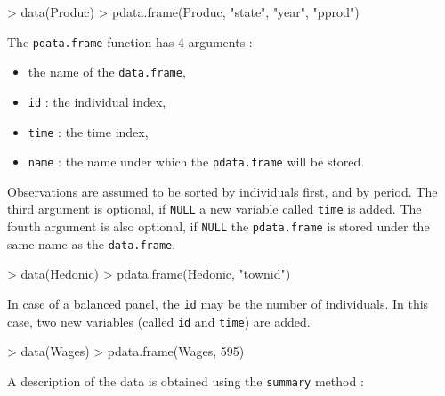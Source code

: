 \documentclass{article}
\begin{document}
\begin{Schunk}
\begin{Sinput}
> data(Produc)
> pdata.frame(Produc, "state", "year", "pprod")
\end{Sinput}
\end{Schunk}

The  \texttt{pdata.frame} function has  4 arguments :

\begin{itemize}
\item the name of the  \texttt{data.frame},
\item \texttt{id} : the individual index,
\item \texttt{time} : the time index,
\item \texttt{name} : the name under which the \texttt{pdata.frame}
  will be stored.
\end{itemize}

Observations are assumed to be sorted by individuals first, and by
period. The third argument is optional, if \texttt{NULL} a new
variable called \texttt{time} is added. The fourth argument is also
optional, if \texttt{NULL} the \texttt{pdata.frame} is stored under
the same name as the \texttt{data.frame}.


\begin{Schunk}
\begin{Sinput}
> data(Hedonic)
> pdata.frame(Hedonic, "townid")
\end{Sinput}
\end{Schunk}

In case of a balanced panel, the \texttt{id} may be the number of
individuals. In this case, two new variables (called \texttt{id} and
\texttt{time}) are added.

\begin{Schunk}
\begin{Sinput}
> data(Wages)
> pdata.frame(Wages, 595)
\end{Sinput}
\end{Schunk}

A description of the data is obtained using the \texttt{summary}
method :
\end{document}
